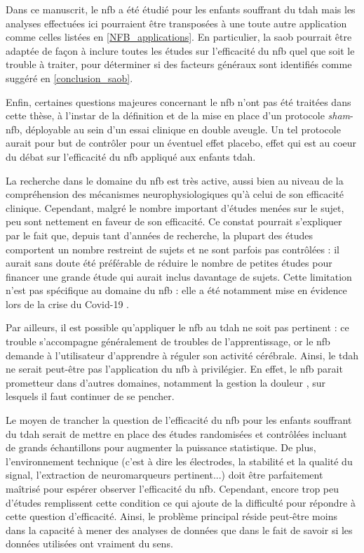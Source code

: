 Dans ce manuscrit, le \gls{nfb} a été étudié pour les enfants souffrant du \gls{tdah} mais les analyses effectuées ici pourraient être 
transposées à une toute autre application comme celles listées en \ref{NFB_applications}.
En particulier, la \gls{saob} pourrait être adaptée de façon à inclure toutes les études sur l'efficacité du \gls{nfb} 
quel que soit le trouble à traiter, pour déterminer si des facteurs généraux sont identifiés comme suggéré en \ref{conclusion_saob}. 

Enfin, certaines questions majeures concernant le \gls{nfb} n'ont pas été traitées dans cette thèse,
à l'instar de la définition et de la mise en place d'un protocole \textit{sham}-\gls{nfb}, déployable au sein d'un essai clinique en double aveugle. 
Un tel protocole 
aurait pour but de contrôler pour un éventuel effet placebo, effet qui est au coeur du débat sur l'efficacité du \gls{nfb} appliqué aux enfants \gls{tdah}. 

La recherche dans le domaine du \gls{nfb} est très active, aussi bien au niveau de la compréhension des mécanismes neurophysiologiques 
qu'à celui de son efficacité clinique.
Cependant, malgré le nombre important d'études menées sur le sujet, peu sont nettement en faveur de son efficacité. 
Ce constat pourrait s'expliquer par le fait que, depuis tant d'années de recherche, la plupart des études comportent un nombre
restreint de sujets et ne sont parfois pas contrôlées : il aurait sans doute été préférable de réduire le nombre de petites études pour financer une grande étude
qui aurait inclus davantage de sujets. Cette limitation n'est pas spécifique au domaine du \gls{nfb} : elle a été notamment mise en évidence lors de la crise du 
Covid-19 \citep{Gautret2020, Sanders2020}.

Par ailleurs, il est possible qu'appliquer le \gls{nfb} au \gls{tdah} ne soit pas pertinent : ce trouble s'accompagne généralement de troubles de l'apprentissage,
or le \gls{nfb} demande à l'utilisateur d'apprendre à réguler son activité cérébrale. Ainsi, le \gls{tdah} ne serait peut-être pas l'application du 
\gls{nfb} à privilégier. En effet, le \gls{nfb} parait prometteur dans d'autres domaines, notamment la gestion la douleur \citep{Mayaud2019}, sur lesquels 
il faut continuer de se pencher.

Le moyen de trancher la question de l'efficacité du \gls{nfb} pour les enfants souffrant du \gls{tdah} serait de mettre en place des études randomisées 
et contrôlées incluant de grands échantillons pour augmenter la puissance statistique. De plus, l'environnement technique (c'est à dire 
les électrodes, la stabilité et la qualité du signal, l'extraction de neuromarqueurs pertinent...) doit être parfaitement maîtrisé pour espérer observer
l'efficacité du \gls{nfb}. Cependant, encore trop peu d'études remplissent cette condition ce qui ajoute de la difficulté pour répondre à cette question d'efficacité. 
Ainsi, le problème principal réside peut-être moins dans la capacité à mener des analyses de données que dans le fait de savoir si les données utilisées 
ont vraiment du sens.  

